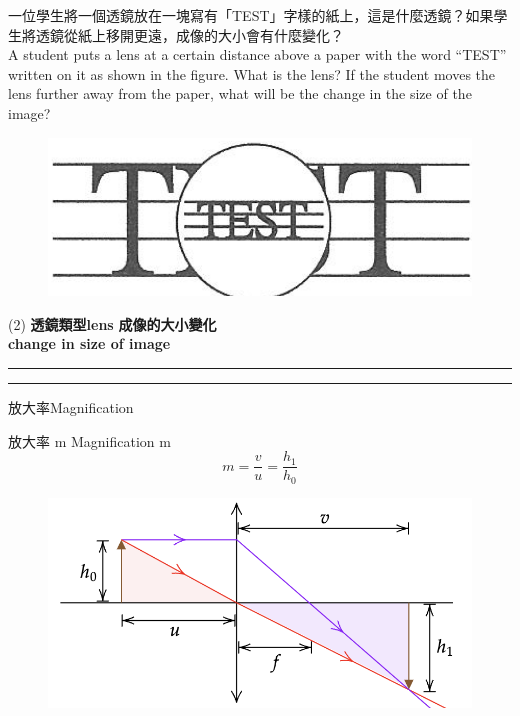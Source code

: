 \documentclass[beamer=true]{standalone}
\begin{document}
\begin{eg}
    一位學生將一個透鏡放在一塊寫有「TEST」字樣的紙上，這是什麼透鏡？如果學生將透鏡從紙上移開更遠，成像的大小會有什麼變化？\\A student puts a lens at a certain distance above a paper with the word ``TEST'' written on it as shown in the figure. What is the lens? If the student moves the lens further away from the paper, what will be the change in the size of the image?
    \begin{figure}
        \centering
        \includegraphics[width=0.5\linewidth]{../../assets/98n9du892nd923.png}
    \end{figure}
    \begin{tasks}[item-indent=2em,label-offset=0em,before-skip=0em,after-item-skip=.8em](2)
        \task [] \textbf{透鏡類型lens}
        \task [] \textbf{成像的大小變化\\change in size of image}
        \task [] \rule{1.5in}{.5pt}
        \task [] \rule{1.5in}{.5pt}
    \end{tasks}
\end{eg}

\begin{frame}{放大率Magnification}
    \begin{alertblock}
        {放大率 m Magnification m}
        \begin{equation}
            m=\frac{v}{u}=\frac{h_1}{h_0}
        \end{equation}

    \end{alertblock}
    \bigskip
    \begin{figure}
        \centering
        \includegraphics[width=0.7\linewidth]{../../assets/nxcu3489f43.png}
    \end{figure}
\end{frame}
\end{document}
